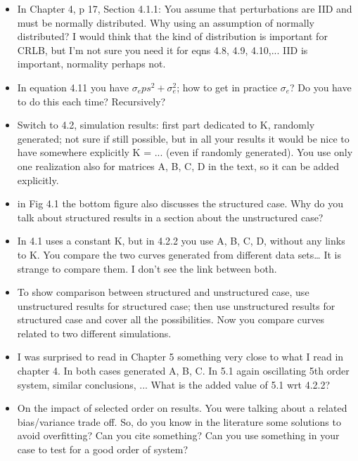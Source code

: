 \documentclass[11pt]{article}
\begin{document}
\begin{itemize}
	\item  In Chapter 4, p 17, Section 4.1.1: You assume that perturbations are IID and must be normally distributed. Why using an assumption of normally distributed? I would think that the kind of distribution is important for CRLB, but I’m not sure you need it for eqns 4.8, 4.9, 4.10,... IID is important, normality perhaps not.
	
	
	\item   In equation 4.11 you have $\sigma_eps^2 + \sigma_e^2$; how to get in practice $\sigma_e$? Do you have to do this each time? Recursively?
	
	\item   Switch to 4.2, simulation results: first part dedicated to K, randomly generated; not sure if still possible, but in all your results it would be nice to have somewhere explicitly K = ... (even if randomly generated). You use only one realization also for matrices A, B, C, D in the text, so it can be added explicitly.	

	
	
	\item   in Fig 4.1 the bottom figure also discusses the structured case. Why do you talk about structured results in a section about the unstructured case?
	
	\item   In 4.1 uses a constant K, but in 4.2.2 you use A, B, C, D, without any links to K. You compare the two curves generated from different data sets… It is strange to compare them. I don't see the link between both.
	
	\item  To show comparison between structured and unstructured case, use unstructured results for structured case; then use unstructured results for structured case and cover all the possibilities. Now you compare curves related to two different simulations.
	
	
	\item   I was surprised to read in Chapter 5 something very close to what I read in chapter 4. In both cases generated A, B, C. In 5.1 again oscillating 5th order system, similar conclusions, ... What is the added value of 5.1 wrt 4.2.2?
	
	\item   On the impact of selected order on results. You were talking about a related bias/variance trade off. So, do you know in the literature some solutions to avoid overfitting? Can you cite something? Can you use something in your case to test for a good order of system?
	

\end{itemize}
\end{document}
